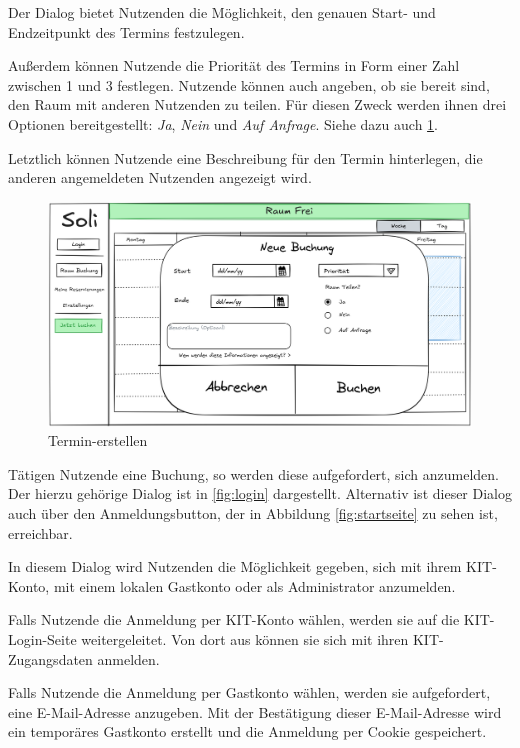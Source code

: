 Der Dialog bietet Nutzenden die Möglichkeit, den genauen Start- und Endzeitpunkt des Termins festzulegen.

Außerdem können Nutzende die Priorität des Termins in Form einer Zahl zwischen 1 und 3 festlegen.
Nutzende können auch angeben, ob sie bereit sind, den Raum mit anderen Nutzenden zu teilen.
Für diesen Zweck werden ihnen drei Optionen bereitgestellt: \textit{Ja}, \textit{Nein} und \textit{Auf Anfrage}.
Siehe dazu auch \ref{fig:buchung}.

Letztlich können Nutzende eine Beschreibung für den Termin hinterlegen, die anderen angemeldeten Nutzenden angezeigt wird.
\clearpage
\begin{figure}[ht]
    \centering
    \includegraphics[scale=0.15]{figures/ui/buchungsdialog}
    \caption{Termin-erstellen}
    \label{fig:buchung}
\end{figure}
\clearpage

Tätigen Nutzende eine Buchung, so werden diese aufgefordert, sich anzumelden.
Der hierzu gehörige Dialog ist in \ref{fig:login} dargestellt.
Alternativ ist dieser Dialog auch über den Anmeldungsbutton, der in Abbildung \ref{fig:startseite} zu sehen ist, erreichbar.

In diesem Dialog wird Nutzenden die Möglichkeit gegeben, sich mit ihrem KIT-Konto, mit einem lokalen Gastkonto oder als Administrator anzumelden.

Falls Nutzende die Anmeldung per KIT-Konto wählen, werden sie auf die KIT-Login-Seite weitergeleitet.
Von dort aus können sie sich mit ihren KIT-Zugangsdaten anmelden.

Falls Nutzende die Anmeldung per Gastkonto wählen, werden sie aufgefordert, eine E-Mail-Adresse anzugeben.
Mit der Bestätigung dieser E-Mail-Adresse wird ein temporäres Gastkonto erstellt und die Anmeldung per Cookie gespeichert.

